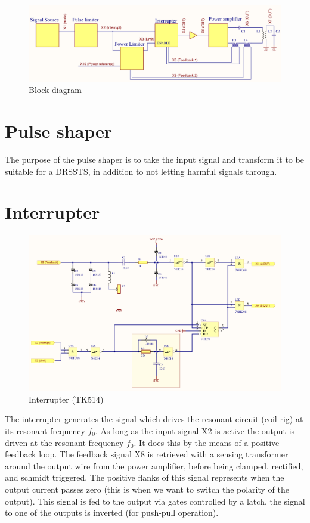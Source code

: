 \begin{figure}[h!]
    \centering
    \includegraphics[width=\textwidth]{Skjema/FunksjonsBlokkskjema.pdf}
    \caption{Block diagram}
    \label{fig:block}
\end{figure}

\newpage
\section{Pulse shaper}
The purpose of the pulse shaper is to take the input signal and transform it to be suitable for a DRSSTS, in addition to not letting harmful signals through.

\section{Interrupter}

\begin{figure}[h!]
    \centering
    \includegraphics[width=\textwidth]{Skjema/TK514_Interrupter.pdf}
    \caption{Interrupter (TK514)}
    \label{fig:interrupter}
\end{figure}

The interrupter generates the signal which drives the resonant circuit (coil rig) at its resonant frequency $f_0$. As long as the input signal X2 is active the output is driven at the resonant frequency $f_0$. It does this by the means of a positive feedback loop. The feedback signal X8 is retrieved with a sensing transformer around the output wire from the power amplifier, before being clamped, rectified, and schmidt triggered. The positive flanks of this signal represents when the output current passes zero (this is when we want to switch the polarity of the output). This signal is fed to the output via gates controlled by a latch, the signal to one of the outputs is inverted (for push-pull operation).

